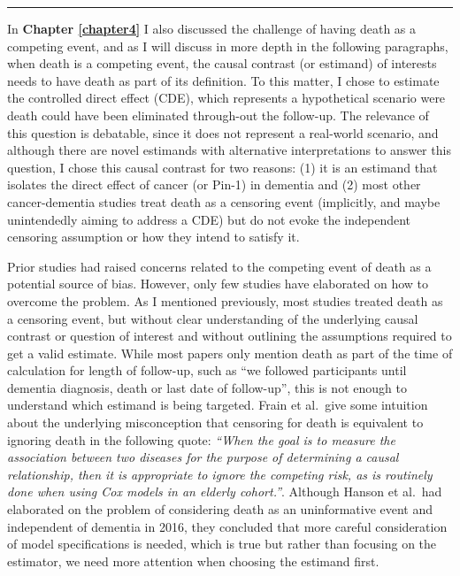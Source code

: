 \documentclass[
]{book}
\begin{document}
\begin{center}\rule{0.5\linewidth}{0.5pt}\end{center}

In \textbf{Chapter \ref{chapter4}} I also discussed the challenge of having death as a competing event, and as I will discuss in more depth in the following paragraphs, when death is a competing event, the causal contrast (or estimand) of interests needs to have death as part of its definition. To this matter, I chose to estimate the controlled direct effect (CDE), which represents a hypothetical scenario were death could have been eliminated through-out the follow-up\autocite{young2020}. The relevance of this question is debatable, since it does not represent a real-world scenario, and although there are novel estimands with alternative interpretations to answer this question\autocite{stensrud2020}, I chose this causal contrast for two reasons: (1) it is an estimand that isolates the direct effect of cancer (or Pin-1) in dementia and (2) most other cancer-dementia studies treat death as a censoring event (implicitly, and maybe unintendedly aiming to address a CDE) but do not evoke the independent censoring assumption or how they intend to satisfy it.

Prior studies had raised concerns related to the competing event of death as a potential source of bias\autocite{ospina2020,hayes_larson2020}. However, only few studies have elaborated on how to overcome the problem\autocite{hanson2016}. As I mentioned previously, most studies treated death as a censoring event\autocite{roe2010,driver2012,nudelman2014,freedman2016,frain2017,bowles2017,prinelli2018}, but without clear understanding of the underlying causal contrast or question of interest and without outlining the assumptions required to get a valid estimate. While most papers only mention death as part of the time of calculation for length of follow-up, such as ``we followed participants until dementia diagnosis, death or last date of follow-up'', this is not enough to understand which estimand is being targeted. Frain et al.~give some intuition about the underlying misconception that censoring for death is equivalent to ignoring death in the following quote: \emph{``When the goal is to measure the association between two diseases for the purpose of determining a causal relationship, then it is appropriate to ignore the competing risk, as is routinely done when using Cox models in an elderly cohort.''}\autocite{frain2017}. Although Hanson et al.~had elaborated on the problem of considering death as an uninformative event and independent of dementia in 2016\autocite{hanson2016}, they concluded that more careful consideration of model specifications is needed, which is true but rather than focusing on the estimator, we need more attention when choosing the estimand first.
\end{document}
